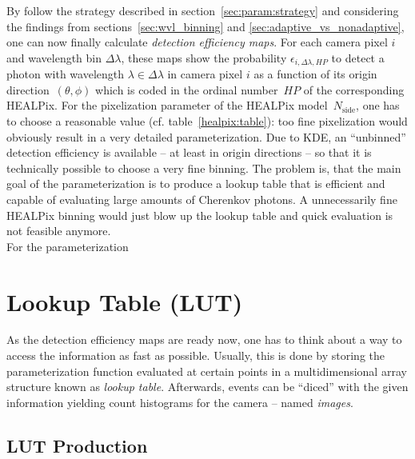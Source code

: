 By follow the strategy described in section~\ref{sec:param:strategy} and considering the findings from sections~\ref{sec:wvl_binning} and \ref{sec:adaptive_vs_nonadaptive}, one can now finally calculate \textit{detection efficiency maps}. For each camera pixel $i$ and wavelength bin $\Delta\lambda$, these maps show the probability $\epsilon_{i,\Delta\lambda,HP}$ to detect a photon with wavelength $\lambda\in\Delta\lambda$ in camera pixel $i$ as a function of its origin direction~$(\theta,\phi)$ which is coded in the ordinal number~$HP$ of the corresponding HEALPix. For the pixelization parameter of the HEALPix model~$N_\text{side}$, one has to choose a reasonable value (cf. table~\ref{healpix:table}): too fine pixelization would obviously result in a very detailed parameterization. Due to KDE, an \enquote{unbinned} detection efficiency is available -- at least in origin directions -- so that it is technically possible to choose a very fine binning. The problem is, that the main goal of the \iceact parameterization is to produce a lookup table that is efficient and capable of evaluating large amounts of Cherenkov photons. A unnecessarily fine HEALPix binning would just blow up the lookup table and quick evaluation is not feasible anymore.\\

For the parameterization 




\section{Lookup Table (LUT)}

As the detection efficiency maps are ready now, one has to think about a way to access the information as fast as possible. Usually, this is done by storing the parameterization function evaluated at certain points in a multidimensional array structure known as \textit{lookup table}. Afterwards, events can be \enquote{diced} with the given information yielding count histograms for the camera -- named \textit{images}.

\subsection{LUT Production}\label{sec:lut_production}

